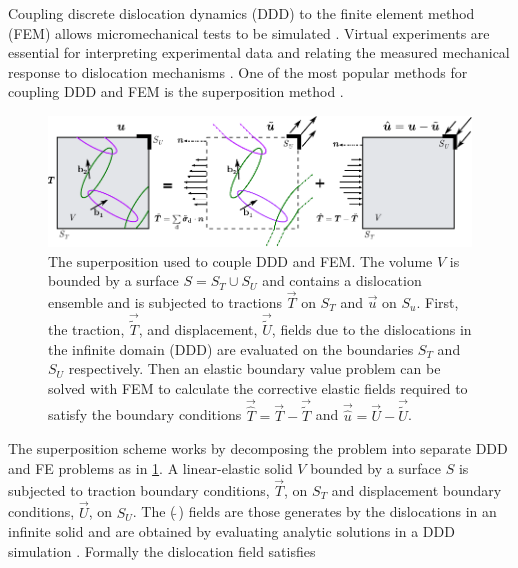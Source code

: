 \documentclass[11pt]{iopart}
\begin{document}
Coupling discrete dislocation dynamics (DDD) to the finite element method (FEM) allows micromechanical tests to be simulated \cite{Groh2009}. Virtual experiments are essential for interpreting experimental data and relating the measured mechanical response to dislocation mechanisms \cite{0965-0393-6-6-007,doi:10.1080/14786430500341250,tarleton2015discrete,YU2018}. One of the most popular methods for coupling DDD and FEM is the superposition method \cite{superposition_scheme0,superposition_scheme1,superposition_scheme2}.
%
\begin{figure}
    \centering
    \includegraphics[width=\linewidth]{fem_ddd.pdf}
    \caption[Superposition Model for DDD-FEM coupling.]{The superposition used to couple DDD and FEM. The volume $V$ is bounded by a surface $S = S_{T} \cup S_{U}$ and contains a dislocation ensemble and is subjected to tractions $\vec{T}$ on $S_{T}$ and $\vec{u}$ on $S_{u}$. First, the traction, $\vec{\tilde{T}}$, and displacement, $\vec{\tilde{U}}$, fields due to the dislocations in the infinite domain (DDD) are evaluated on the boundaries $S_{T}$ and $S_{U}$ respectively. Then an elastic boundary value problem can be solved with FEM to calculate the corrective elastic fields required to satisfy the boundary conditions $\vec{\hat{T}} = \vec{T} - \vec{\tilde{T}}$ and $\vec{\hat{u}} = \vec{U} - \vec{\tilde{U}}$.}
    \label{f:superposition_scheme}
\end{figure}
%        
The superposition scheme works by decomposing the problem into separate DDD and FE problems as in \cref{f:superposition_scheme}. A linear-elastic solid $V$ bounded by a surface $S$ is subjected to traction boundary conditions, $\vec{T}$, on $S_{T}$ and displacement boundary conditions, $\vec{U}$, on $S_{U}$. The ($\tilde{~}$) fields are those generates by the dislocations in an infinite solid and are obtained by evaluating analytic solutions in a DDD simulation \cite{Cai2006}. Formally the dislocation field satisfies
%
\end{document}
